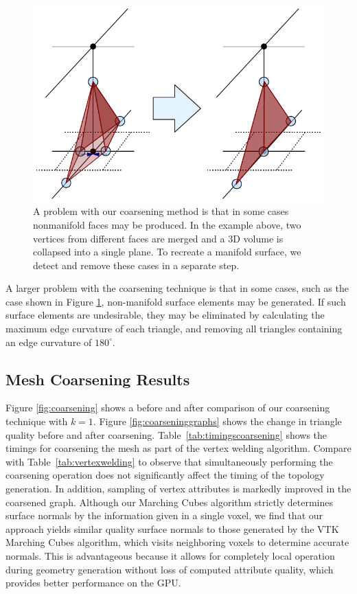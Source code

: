 \documentclass[review,journal]{vgtc}         %
\begin{document}
\begin{figure}[!b]
\includegraphics[width=\columnwidth]{Nonmanifold.pdf}
\caption{A problem with our coarsening method is that in some cases nonmanifold faces may be produced. In the example above, two vertices from different faces are merged and a 3D volume is collapsed into a single plane. To recreate a manifold surface, we detect and remove these cases in a separate step.}
\label{fig:Nonmanifold}
\end{figure}

A larger problem with the coarsening technique is that in some cases, such as the case shown in Figure \ref{fig:Nonmanifold}, non-manifold surface elements may be generated. If such surface elements are undesirable, they may be eliminated by calculating the maximum edge curvature of each triangle, and removing all triangles containing an edge curvature of $180^{\circ}$.

\subsection{Mesh Coarsening Results}

Figure \ref{fig:coarsening} shows a before and after comparison of our coarsening technique with $k=1$. 
Figure \ref{fig:coarseninggraphs} shows the change in triangle quality before and after coarsening.
Table~\ref{tab:timingscoarsening} shows the timings for coarsening the mesh as part of the vertex welding algorithm. Compare with Table~\ref{tab:vertexwelding} to observe that simultaneously performing the coarsening operation does not significantly affect the timing of the topology generation. In addition, sampling of vertex attributes is markedly improved in the coarsened graph. Although our Marching Cubes algorithm strictly determines surface normals by the information given in a single voxel, we find that our approach yields similar quality surface normals to those generated by the VTK Marching Cubes algorithm, which visits neighboring voxels to determine accurate normals. This is advantageous because it allows for completely local operation during geometry generation without loss of computed attribute quality, which provides better performance on the GPU.
\end{document}
